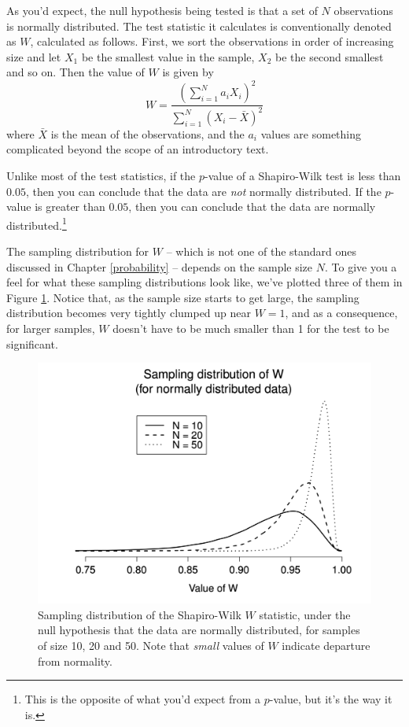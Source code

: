 \documentclass[
]{book}
\theoremstyle{definition}
\theoremstyle{definition}
\theoremstyle{definition}
\theoremstyle{definition}
\theoremstyle{remark}
\begin{document}
As you'd expect, the null hypothesis being tested is that a set of \(N\) observations is normally distributed. The test statistic it calculates is conventionally denoted as \(W\), calculated as follows. First, we sort the observations in order of increasing size and let \(X_1\) be the smallest value in the sample, \(X_2\) be the second smallest and so on. Then the value of \(W\) is given by
\[
W = \frac{ \left( \sum_{i = 1}^N a_i X_i \right)^2 }{ \sum_{i = 1}^N (X_i - \bar{X})^2}
\]
where \(\bar{X}\) is the mean of the observations, and the \(a_i\) values are something complicated beyond the scope of an introductory text.

Unlike most of the test statistics, if the \(p\)-value of a Shapiro-Wilk test is less than \(0.05\), then you can conclude that the data are \emph{not} normally distributed. If the \(p\)-value is greater than \(0.05\), then you can conclude that the data are normally distributed.\footnote{This is the opposite of what you'd expect from a \(p\)-value, but it's the way it is.}

The sampling distribution for \(W\) -- which is not one of the standard ones discussed in Chapter \ref{probability} -- depends on the sample size \(N\). To give you a feel for what these sampling distributions look like, we've plotted three of them in Figure \ref{fig:swdist}. Notice that, as the sample size starts to get large, the sampling distribution becomes very tightly clumped up near \(W=1\), and as a consequence, for larger samples, \(W\) doesn't have to be much smaller than 1 for the test to be significant.



\begin{figure}

{\centering \includegraphics[width=0.66\linewidth]{resources/image/shapirowilkdist} 

}

\caption{Sampling distribution of the Shapiro-Wilk \(W\) statistic, under the null hypothesis that the data are normally distributed, for samples of size 10, 20 and 50. Note that \emph{small} values of \(W\) indicate departure from normality.}\label{fig:swdist}
\end{figure}
\end{document}
